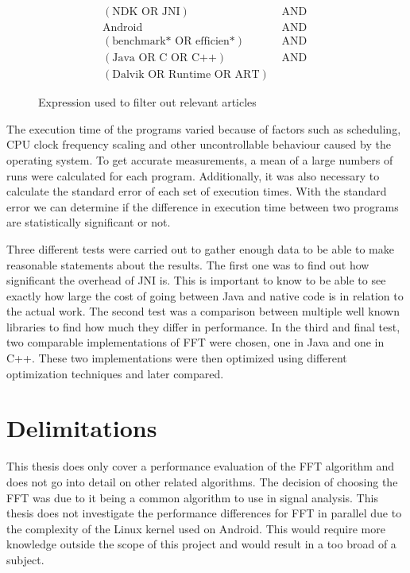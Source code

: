\begin{figure}[H]
    \centering
    \begin{align*}
        (\text{NDK OR JNI})               & \text{ AND } \\
        \text{Android}                    & \text{ AND } \\
        (\text{benchmark* OR efficien*})  & \text{ AND } \\
        (\text{Java OR C OR C++})         & \text{ AND } \\
        (\text{Dalvik OR Runtime OR ART}) &
    \end{align*}
    \caption{Expression used to filter out relevant articles}
    \label{fig:db:search}
\end{figure}

The execution time of the programs varied because of factors such as scheduling, CPU clock frequency scaling and other uncontrollable behaviour caused by the operating system. To get accurate measurements, a mean of a large numbers of runs were calculated for each program. Additionally, it was also necessary to calculate the standard error of each set of execution times. With the standard error we can determine if the difference in execution time between two programs are statistically significant or not.

Three different tests were carried out to gather enough data to be able to make reasonable statements about the results. The first one was to find out how significant the overhead of JNI is. This is important to know to be able to see exactly how large the cost of going between Java and native code is in relation to the actual work. The second test was a comparison between multiple well known libraries to find how much they differ in performance. In the third and final test, two comparable implementations of FFT were chosen, one in Java and one in C++. These two implementations were then optimized using different optimization techniques and later compared.

\section{Delimitations}
This thesis does only cover a performance evaluation of the FFT algorithm and does not go into detail on other related algorithms. The decision of choosing the FFT was due to it being a common algorithm to use in signal analysis. This thesis does not investigate the performance differences for FFT in parallel due to the complexity of the Linux kernel used on Android. This would require more knowledge outside the scope of this project and would result in a too broad of a subject.


